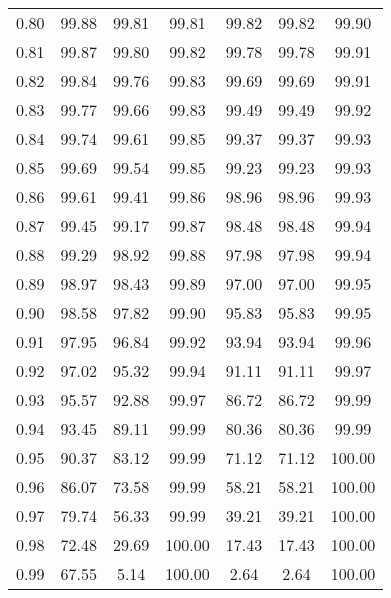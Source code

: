\begin{tabular}{|c|c|c|c|c|c|c|}
      0.80 &     99.88 &     99.81 &      99.81 &   99.82 &      99.82 &         99.90 \\
      0.81 &     99.87 &     99.80 &      99.82 &   99.78 &      99.78 &         99.91 \\
      0.82 &     99.84 &     99.76 &      99.83 &   99.69 &      99.69 &         99.91 \\
      0.83 &     99.77 &     99.66 &      99.83 &   99.49 &      99.49 &         99.92 \\
      0.84 &     99.74 &     99.61 &      99.85 &   99.37 &      99.37 &         99.93 \\
      0.85 &     99.69 &     99.54 &      99.85 &   99.23 &      99.23 &         99.93 \\
      0.86 &     99.61 &     99.41 &      99.86 &   98.96 &      98.96 &         99.93 \\
      0.87 &     99.45 &     99.17 &      99.87 &   98.48 &      98.48 &         99.94 \\
      0.88 &     99.29 &     98.92 &      99.88 &   97.98 &      97.98 &         99.94 \\
      0.89 &     98.97 &     98.43 &      99.89 &   97.00 &      97.00 &         99.95 \\
      0.90 &     98.58 &     97.82 &      99.90 &   95.83 &      95.83 &         99.95 \\
      0.91 &     97.95 &     96.84 &      99.92 &   93.94 &      93.94 &         99.96 \\
      0.92 &     97.02 &     95.32 &      99.94 &   91.11 &      91.11 &         99.97 \\
      0.93 &     95.57 &     92.88 &      99.97 &   86.72 &      86.72 &         99.99 \\
      0.94 &     93.45 &     89.11 &      99.99 &   80.36 &      80.36 &         99.99 \\
      0.95 &     90.37 &     83.12 &      99.99 &   71.12 &      71.12 &        100.00 \\
      0.96 &     86.07 &     73.58 &      99.99 &   58.21 &      58.21 &        100.00 \\
      0.97 &     79.74 &     56.33 &      99.99 &   39.21 &      39.21 &        100.00 \\
      0.98 &     72.48 &     29.69 &     100.00 &   17.43 &      17.43 &        100.00 \\
      0.99 &     67.55 &      5.14 &     100.00 &    2.64 &       2.64 &        100.00 \\
\bottomrule
\end{tabular}
